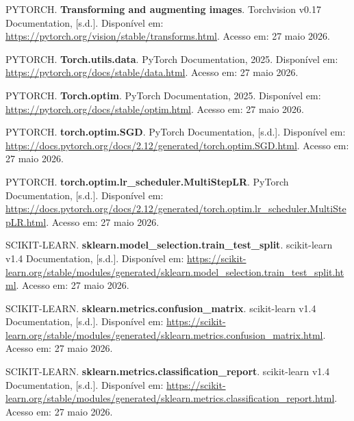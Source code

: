 \documentclass[12pt,a4paper]{article}
\begin{document}
\vspace{0.5cm}

\noindent PYTORCH. \textbf{Transforming and augmenting images}. Torchvision v0.17 Documentation, [s.d.]. Disponível em: \url{https://pytorch.org/vision/stable/transforms.html}. Acesso em: 27 maio 2026.

\vspace{0.5cm}

\noindent PYTORCH. \textbf{Torch.utils.data}. PyTorch Documentation, 2025. Disponível em: \url{https://pytorch.org/docs/stable/data.html}. Acesso em: 27 maio 2026.

\vspace{0.5cm}

\noindent PYTORCH. \textbf{Torch.optim}. PyTorch Documentation, 2025. Disponível em: \url{https://pytorch.org/docs/stable/optim.html}. Acesso em: 27 maio 2026.

\vspace{0.5cm}

\noindent PYTORCH. \textbf{torch.optim.SGD}. PyTorch Documentation, [s.d.]. Disponível em: \url{https://docs.pytorch.org/docs/2.12/generated/torch.optim.SGD.html}. Acesso em: 27 maio 2026. 

\vspace{0.5cm}

\noindent PYTORCH. \textbf{torch.optim.lr\_scheduler.MultiStepLR}. PyTorch Documentation, [s.d.]. Disponível em: \url{https://docs.pytorch.org/docs/2.12/generated/torch.optim.lr_scheduler.MultiStepLR.html}. Acesso em: 27 maio 2026.

\vspace{0.5cm}

\noindent SCIKIT-LEARN. \textbf{sklearn.model\_selection.train\_test\_split}. scikit-learn v1.4 Documentation, [s.d.]. Disponível em: \url{https://scikit-learn.org/stable/modules/generated/sklearn.model_selection.train_test_split.html}. Acesso em: 27 maio 2026.

\vspace{0.5cm}

\noindent SCIKIT-LEARN. \textbf{sklearn.metrics.confusion\_matrix}. scikit-learn v1.4 Documentation, [s.d.]. Disponível em: \url{https://scikit-learn.org/stable/modules/generated/sklearn.metrics.confusion_matrix.html}. Acesso em: 27 maio 2026.

\vspace{0.5cm}

\noindent SCIKIT-LEARN. \textbf{sklearn.metrics.classification\_report}. scikit-learn v1.4 Documentation, [s.d.]. Disponível em: \url{https://scikit-learn.org/stable/modules/generated/sklearn.metrics.classification_report.html}. Acesso em: 27 maio 2026.
\end{document}
